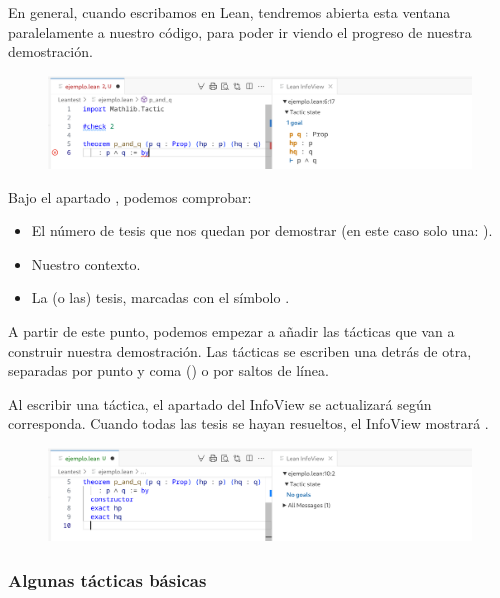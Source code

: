 En general, cuando escribamos en Lean, tendremos abierta esta ventana paralelamente a nuestro código, para poder ir viendo el progreso de nuestra demostración.

\begin{figure}[h]
  \centering
  \includegraphics[width=1\textwidth]{figuras/theorem-example-light-version.png}
\end{figure}

Bajo el apartado , podemos comprobar:

\begin{itemize}
  \item El número de tesis que nos quedan por demostrar (en este caso solo una: ).
  \item Nuestro contexto.
  \item La (o las) tesis, marcadas con el símbolo \bluecode{$\vdash$}.
\end{itemize}

A partir de este punto, podemos empezar a añadir las tácticas que van a construir nuestra demostración. Las tácticas se escriben una detrás de otra, separadas por punto y coma (\code{;}) o por saltos de línea.

Al escribir una táctica, el apartado  del InfoView se actualizará según corresponda. Cuando todas las tesis se hayan resueltos, el InfoView mostrará .

\begin{figure}[h]
  \centering
  \includegraphics[width=1\textwidth]{figuras/no-goals-example-light-version.png}
\end{figure}

\subsubsection{Algunas tácticas básicas}

